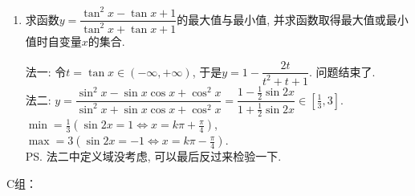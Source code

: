 \begin{enumerate}
    \item 求函数$y=\dfrac{\tan^2x-\tan{x}+1}{\tan^2x+\tan{x}+1}$的最大值与最小值, 并求函数取得最大值或最小值时自变量$x$的集合. 
    \begin{jieda}
    法一: 令$t=\tan{x}\in(-\infty,+\infty)$, 于是$y=1-\dfrac{2t}{t^2+t+1}$. 问题结束了. \\
    法二: $y=\dfrac{\sin^2x-\sin{x}\cos{x}+\cos^2x}{\sin^2x+\sin{x}\cos{x}+\cos^2x}=\dfrac{1-\frac{1}{2}\sin2x}{1+\frac{1}{2}\sin2x}\in[\frac{1}{3},3]$. \\
    $\min=\frac{1}{3}(\sin2x=1\iff x=k\pi+\frac{\pi}{4})$, $\max=3(\sin2x=-1\iff x=k\pi-\frac{\pi}{4})$. \\
    \ps 法二中定义域没考虑, 可以最后反过来检验一下. 
    \end{jieda}
\end{enumerate}
C组：
